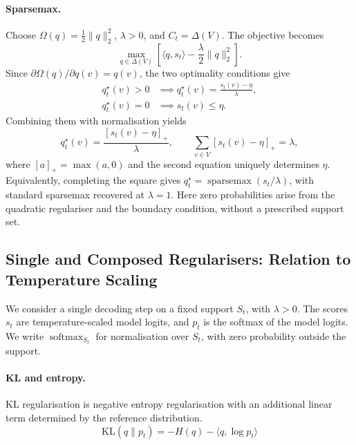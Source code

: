 \documentclass{article} %
\begin{document}
\paragraph{Sparsemax.}
Choose $\Omega(q)=\frac{1}{2}\|q\|_2^2$,
$\lambda>0$, and $C_t=\Delta(V)$.
The objective becomes
\begin{equation}
\max_{q\in\Delta(V)}
\left[
\langle q,s_t\rangle-\frac{\lambda}{2}\|q\|_2^2
\right].
\end{equation}
Since $\partial\Omega(q)/\partial q(v)=q(v)$,
the two optimality conditions give
\begin{equation}
\begin{aligned}
q_t^\star(v)>0
&\implies q_t^\star(v)=\frac{s_t(v)-\eta}{\lambda},\\
q_t^\star(v)=0
&\implies s_t(v)\leq\eta.
\end{aligned}
\end{equation}
Combining them with normalisation yields
\begin{equation}
q_t^\star(v)=\frac{[s_t(v)-\eta]_+}{\lambda},
\qquad
\sum_{v\in V}[s_t(v)-\eta]_+=\lambda,
\end{equation}
where $[a]_+=\max(a,0)$ and the second equation uniquely
determines $\eta$.
Equivalently, completing the square gives
$q_t^\star=\operatorname{sparsemax}(s_t/\lambda)$,
with standard sparsemax recovered at $\lambda=1$.
Here zero probabilities arise from the quadratic regulariser
and the boundary condition, without a prescribed support set.


\subsection{Single and Composed Regularisers: Relation to Temperature Scaling}
\label{app:temperature}

We consider a single decoding step on a fixed support $S_t$, with $\lambda>0$. The scores $s_t$ are temperature-scaled model logits, and $p_t$ is the softmax of the model logits. We write $\operatorname{softmax}_{S_t}$ for normalisation over $S_t$, with zero probability outside the support.

\paragraph{KL and entropy.} KL regularisation is negative entropy regularisation with an additional linear term determined by the reference distribution.
\begin{equation}
    \mathrm{KL}(q\|p_t)=-H(q)-\langle q,\log p_t\rangle
\end{equation}
\end{document}
